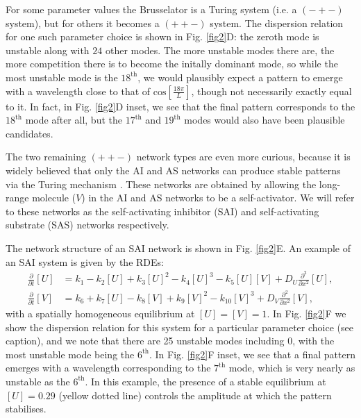 For some parameter values the Brusselator is a Turing system (i.e. a $(-+-)$ system), but for others it becomes a $(++-)$ system. The dispersion relation for one such parameter choice is shown in Fig. \ref{fig2}D: the zeroth mode is unstable along with $24$ other modes. The more unstable modes there are, the more competition there is to become the initally dominant mode, so while the most unstable mode is the $18^\text{th}$, we would plausibly expect a pattern to emerge with a wavelength close to that of $\text{cos}\left[\frac{18\pi}{L}\right]$, though not necessarily exactly equal to it. In fact, in Fig. \ref{fig2}D inset, we see that the final pattern corresponds to the $18^\text{th}$ mode after all, but the $17^\text{th}$ and $19^\text{th}$ modes would also have been plausible candidates.

The two remaining $(++-)$ network types are even more curious, because it is widely believed that only the AI and AS networks can produce stable patterns via the Turing mechanism \cite{murray2001mathematical,marcon2016high}. These networks are obtained by allowing the long-range molecule ($V$) in the AI and AS networks to be a self-activator. We will refer to these networks as the self-activating inhibitor (SAI) and self-activating substrate (SAS) networks respectively. 

The network structure of an SAI network is shown in Fig. \ref{fig2}E. An example of an SAI system is given by the RDEs:
\begin{align}\label{sai}
\frac{\partial}{\partial t} [U]&= k_1-k_2[U]+k_3[U]^2-k_4[U]^3-k_5[U][V]+D_U\frac{\partial^2}{\partial x^2}[U],\\
\frac{\partial}{\partial t} [V]&=k_6+k_7[U]-k_8[V]+k_9[V]^2-k_{10}[V]^3+D_V\frac{\partial^2}{\partial x^2}[V],\nonumber
\end{align}
with a spatially homogeneous equilibrium at $[U]=[V]=1$. In Fig. \ref{fig2}F we show the dispersion relation for this system for a particular parameter choice (see caption), and we note that there are 25 unstable modes including 0, with the most unstable mode being the $6^\text{th}$. In Fig. \ref{fig2}F inset, we see that a final pattern emerges with a wavelength corresponding to the $7^\text{th}$ mode, which is very nearly as unstable as the $6^\text{th}$. In this example, the presence of a stable equilibrium at $[U]=0.29$ (yellow dotted line) controls the amplitude at which the pattern stabilises. 

